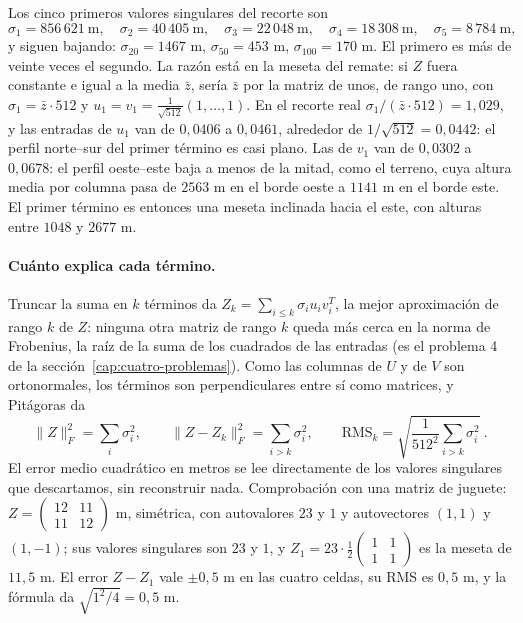 Los cinco primeros valores singulares del recorte son
\[
  \sigma_1=856\,621\ \text{m},\quad
  \sigma_2=40\,405\ \text{m},\quad
  \sigma_3=22\,048\ \text{m},\quad
  \sigma_4=18\,308\ \text{m},\quad
  \sigma_5=8\,784\ \text{m},
\]
y siguen bajando: \(\sigma_{20}=1467\) m, \(\sigma_{50}=453\) m, \(\sigma_{100}=170\) m. El
primero es más de veinte veces el segundo. La razón está en la meseta del remate: si \(Z\) fuera
constante e igual a la media \(\bar z\), sería \(\bar z\) por la matriz de unos, de rango uno,
con \(\sigma_1=\bar z\cdot512\) y \(u_1=v_1=\tfrac1{\sqrt{512}}(1,\dots,1)\). En el
recorte real \(\sigma_1/(\bar z\cdot512)=1{,}029\), y las entradas de \(u_1\) van de
\(0{,}0406\) a \(0{,}0461\), alrededor de \(1/\sqrt{512}=0{,}0442\): el perfil norte--sur del
primer término es casi plano. Las de \(v_1\) van de \(0{,}0302\) a \(0{,}0678\): el perfil
oeste--este baja a menos de la mitad, como el terreno, cuya altura media por columna pasa de
\(2563\) m en el borde oeste a \(1141\) m en el borde este. El primer término es entonces una
meseta inclinada hacia el este, con alturas entre \(1048\) y \(2677\) m.

\paragraph{Cuánto explica cada término.} Truncar la suma en \(k\) términos da
\(Z_k=\sum_{i\le k}\sigma_iu_iv_i^T\), la mejor aproximación de rango \(k\) de \(Z\): ninguna
otra matriz de rango \(k\) queda más cerca en la norma de Frobenius, la raíz de la suma de los
cuadrados de las entradas (es el problema 4 de la sección~\ref{cap:cuatro-problemas}). Como
las columnas de \(U\) y de \(V\) son ortonormales, los términos son perpendiculares entre sí
como matrices, y Pitágoras da
\[
  \|Z\|_F^2=\sum_{i}\sigma_i^2,\qquad
  \|Z-Z_k\|_F^2=\sum_{i>k}\sigma_i^2,\qquad
  \mathrm{RMS}_k=\sqrt{\frac{1}{512^2}\sum_{i>k}\sigma_i^2}\ .
\]
El error medio cuadrático en metros se lee directamente de los valores singulares que
descartamos, sin reconstruir nada. Comprobación con una matriz de juguete:
\(Z=\begin{pmatrix}12&11\\11&12\end{pmatrix}\) m, simétrica, con autovalores \(23\) y \(1\)
y autovectores \((1,1)\) y \((1,-1)\); sus valores singulares son \(23\) y \(1\), y
\(Z_1=23\cdot\tfrac12\begin{pmatrix}1&1\\1&1\end{pmatrix}\) es la meseta de \(11{,}5\) m. El
error \(Z-Z_1\) vale \(\pm0{,}5\) m en las cuatro celdas, su RMS es \(0{,}5\) m, y la fórmula
da \(\sqrt{1^2/4}=0{,}5\) m.

